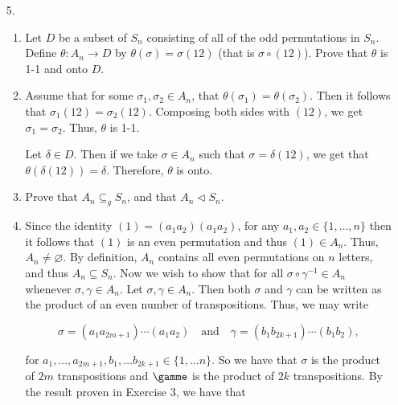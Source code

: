 \documentclass[12pt]{article}
\makeatletter
\theoremstyle{definition}
\theoremstyle{remark}
\renewenvironment{proof}[1][\proofname]{\par
  \pushQED{\qed}%
  \normalfont \topsep6\p@\@plus6\p@\relax
  \list{}{\leftmargin=0mm
          \rightmargin=0mm
          \settowidth{\itemindent}{\itshape#1}%
          \labelwidth=\itemindent
          \parsep=0pt \listparindent=\parindent 
  }
  \item[\hskip\labelsep
        \itshape
    #1\@addpunct{.}]\ignorespaces
}{%
  \popQED\endlist\@endpefalse
}
\let\oldproofname=\proofname
\renewcommand{\proofname}{\bf{\textit{\oldproofname}}}
\makeatother
\begin{document}
\begin{enumerate}[leftmargin=*]
        \item[5.]\hfill
            \begin{enumerate}[label=\alph*)]
                \item Let $D$ be a subset of $S_n$ consisting of all of the odd permutations in $S_n$. Define $\theta\colon A_n\rightarrow D$ by $\theta(\sigma)=\sigma(12)$ (that is $\sigma\circ(12)$). Prove that $\theta$ is 1-1 and onto $D$.
                    \begin{proof}
                        Assume that for some $\sigma_1,\sigma_2\in A_n$, that $\theta(\sigma_1)=\theta(\sigma_2)$. Then it follows that $\sigma_1(12)=\sigma_2(12)$. Composing both sides with $(12)$, we get $\sigma_1=\sigma_2$. Thus, $\theta$ is 1-1.\par\hspace{4mm} Let $\delta\in D$. Then if we take $\sigma\in A_n$ such that $\sigma=\delta(12)$, we get that $\theta(\delta(12))=\delta$. Therefore, $\theta$ is onto.
                    \end{proof}
                    
                \item Prove that $A_n\subseteq_g S_n$, and that $A_n\triangleleft S_n$.
                    \begin{proof}
                        Since the identity $(1)=(a_1a_2)(a_1a_2)$, for any $a_1,a_2\in\{1,\dots, n\}$ then it follows that $(1)$ is an even permutation and thus $(1)\in A_n$. Thus, $A_n\neq\varnothing$. By definition, $A_n$ contains all even permutations on $n$ letters, and thus $A_n\subseteq S_n$. Now we wish to show that for all $\sigma\circ\gamma^{-1}\in A_n$ whenever $\sigma,\gamma\in A_n$. Let $\sigma,\gamma\in A_n$. Then both $\sigma$ and $\gamma$ can be written as the product of an even number of transpositions. Thus, we may write 
                        
                        \begin{equation*}
                            \sigma=(a_1a_{2m+1})\cdots(a_1a_2)\quad\text{and}\quad\gamma=(b_1b_{2k+1})\cdots(b_1b_2),
                        \end{equation*}
                        
                        for $a_1,\dots,a_{2m+1},b_1,\dots b_{2k+1}\in\{1,\dots n\}$. So we have that $\sigma$ is the product of $2m$ transpositions and $\gamme$ is the product of $2k$ transpositions. By the result proven in Exercise 3, we have that 
                        

\end{proof}
\end{enumerate}
\end{enumerate}
\end{document}
